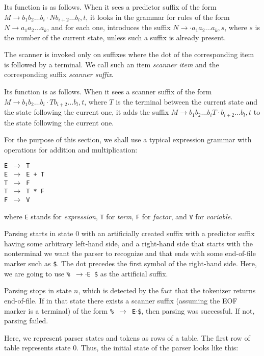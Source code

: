 \documentclass[11pt]{article}
\def\ra{\rightarrow}
\begin{document}
Its function is as follows.  When it sees a predictor suffix of the
form $M \ra b_1 b_2 \ldots b_i \cdot N b_{i+2} \ldots b_l, t$, it
looks in the grammar for rules of the form $N \ra a_1 a_2 \ldots a_k$,
and for each one, introduces the suffix $N \ra \cdot a_1 a_2 \ldots
a_k, s$, where $s$ is the number of the current state, unless such a
suffix is already present. 

The scanner is invoked only on suffixes where the dot of the
corresponding item is followed by a terminal.  We call such an item
\emph{scanner item} and the corresponding suffix \emph{scanner
suffix}.

Its function is as follows.  When it sees a scanner suffix of the form
$M \ra b_1 b_2 \ldots b_i \cdot T b_{i+2} \ldots b_l, t$, where $T$ is
the terminal between the current state and the state following the
current one, it adds the suffix $M \ra b_1 b_2 \ldots b_i T \cdot
b_{i+2} \ldots b_l, t$ to the state following the current one.

For the purpose of this section, we shall use a typical expression
grammar with operations for addition and multiplication:

\texttt{E $\ra$ T\\E $\ra$ E + T\\T $\ra$ F\\T $\ra$ T * F\\F $\ra$ V} 

where \texttt{E} stands for \emph{expression}, \texttt{T} for
\emph{term}, \texttt{F} for \emph{factor}, and \texttt{V} for
\emph{variable}. 

Parsing starts in state $0$ with an artificially created suffix with a
predictor suffix having some arbitrary left-hand side, and a right-hand
side that starts with the nonterminal we want the parser to recognize
and that ends with some end-of-file marker such as \texttt{\$}.  The
dot precedes the first symbol of the right-hand side.  Here, we are
going to use \texttt{\% $\rightarrow$$\cdot$E \$} as the artificial
suffix. 

Parsing stops in state $n$, which is detected by the fact that the
tokenizer returns end-of-file.  If in that state there exists a
scanner suffix (assuming the EOF marker is a terminal) of the form
\texttt{\% $\rightarrow$ E$\cdot$\$}, then parsing was successful.  If
not, parsing failed.  

Here, we represent parser states and tokens as rows of a table.  The
first row of table represents state $0$.  Thus, the initial state of
the parser looks like this:
\end{document}
